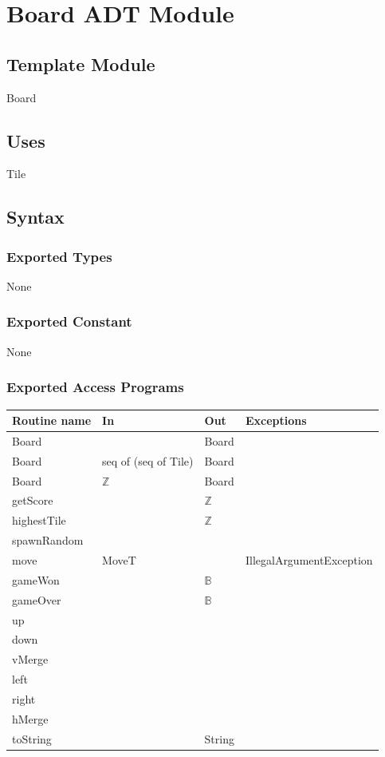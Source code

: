 \documentclass[12pt]{article}
\begin{document}
\newpage
\section* {Board ADT Module}

\subsection*{Template Module}

Board

\subsection* {Uses}

Tile

\subsection* {Syntax}

\subsubsection* {Exported Types}

None

\subsubsection* {Exported Constant}

None

\subsubsection* {Exported Access Programs}

\begin{tabular}{| l | l | l | l |}
\hline
\textbf{Routine name} & \textbf{In} & \textbf{Out} & \textbf{Exceptions}\\
\hline
Board & ~ & Board & \\
\hline
Board & seq of (seq of Tile) & Board & \\
\hline
Board & $\mathbb{Z}$ & Board & \\
\hline
getScore & ~ & $\mathbb{Z}$ & \\
\hline
highestTile & ~ & $\mathbb{Z}$ & \\
\hline
spawnRandom & ~ & ~ & \\
\hline
move & MoveT & ~ & IllegalArgumentException\\
\hline
gameWon & ~ & $\mathbb{B}$ & \\
\hline
gameOver & ~ & $\mathbb{B}$ & \\
\hline
up & ~ & ~ & \\
\hline
down & ~ & ~ & \\
\hline
vMerge & ~ & ~ & \\
\hline
left & ~ & ~ & \\
\hline
right & ~ & ~ & \\
\hline
hMerge & ~ & ~ & \\
\hline
toString & ~ & String & \\
\hline

\end{tabular}
\end{document}
